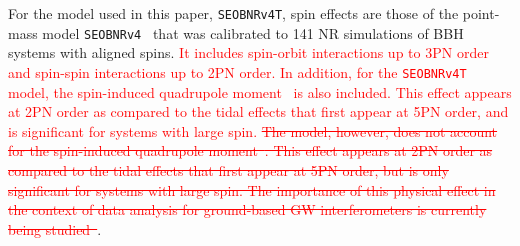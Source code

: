 \documentclass[prd,aps,letter,twocolumn,floatfix,notitlepage,nofootinbib]{revtex4-1}
\newcommand{\red}[1]{\textcolor{red}{#1}}
\begin{document}
For the model used in this paper, \texttt{SEOBNRv4T}, spin effects are those of the point-mass model \texttt{SEOBNRv4}~\cite{Bohe:2016gbl} that was calibrated to 141 NR simulations of BBH systems with aligned spins. \red{It includes spin-orbit interactions up to 3PN order and spin-spin interactions up to 2PN order. In addition, for the \texttt{SEOBNRv4T} model, the spin-induced quadrupole moment~\cite{Poisson1998} is also included. This effect appears at 2PN order as compared to the tidal effects that first appear at 5PN order, and is significant for systems with large spin.} \red{\sout{The model, however, does not account for the spin-induced quadrupole moment~\cite{Poisson1998}. This effect appears at 2PN order as compared to the tidal effects that first appear at 5PN order, but is only significant for systems with large spin. The importance of this physical effect in the context of data analysis for ground-based GW interferometers is currently being studied~\cite{HarryHinderer2018}}}.
\end{document}

